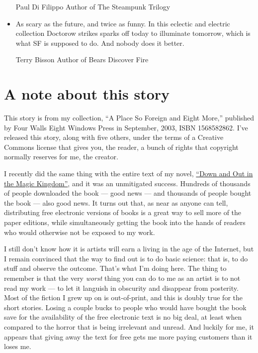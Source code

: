 \begin{itemize}
  \begin{authorof}
    Paul Di Filippo Author of The Steampunk Trilogy
  \end{authorof}
\item
  As scary as the future, and twice as funny. In this eclectic and
  electric collection Doctorow strikes sparks off today to illuminate
  tomorrow, which is what SF is supposed to do. And nobody does it
  better.

  \begin{authorof}
    Terry Bisson Author of Bears Discover Fire
  \end{authorof}
\end{itemize}

\section{A note about this story}

This story is from my collection,
``A Place So Foreign and Eight More,'' published by Four Walls
Eight Windows Press in September, 2003, ISBN 1568582862. I've
released this story, along with five others, under the terms of a
Creative Commons license that gives you, the reader, a bunch of
rights that copyright normally reserves for me, the creator.

I recently did the same thing with the entire text of my novel,
\href{http://craphound.com/down}{``Down and Out in the Magic Kingdom''},
and it was an unmitigated success. Hundreds of thousands of people
downloaded the book --- good news --- and thousands of people
bought the book --- also good news. It turns out that, as near as
anyone can tell, distributing free electronic versions of books is
a great way to sell more of the paper editions, while
simultaneously getting the book into the hands of readers who would
otherwise not be exposed to my work.

I still don't know how it is artists will earn a living in the age
of the Internet, but I remain convinced that the way to find out is
to do basic science: that is, to do stuff and observe the outcome.
That's what I'm doing here. The thing to remember is that the very
\emph{worst} thing you can do to me as an artist is to not read my
work --- to let it languish in obscurity and disappear from
posterity. Most of the fiction I grew up on is out-of-print, and
this is doubly true for the short stories. Losing a couple bucks to
people who would have bought the book save for the availability of
the free electronic text is no big deal, at least when compared to
the horror that is being irrelevant and unread. And luckily for me,
it appears that giving away the text for free gets me more paying
customers than it loses me.

